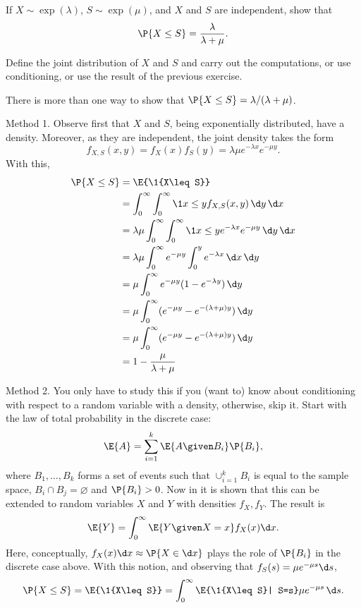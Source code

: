 \begin{exercise}\label{ex:3}
   If $X\sim \exp(\lambda)$, $S\sim\exp(\mu)$, and $X$ and $S$ are independent, show that 
    \begin{equation*}
      \P{X\leq S} = \frac{\lambda}{\lambda+\mu}.
    \end{equation*}
    \begin{hint}
     Define the joint distribution of $X$ and $S$ and carry out
      the computations, or use conditioning, or use the result of the
      previous exercise.
    \end{hint}
\begin{solution}
There is more than one way to show that $\P{X\leq S} = \lambda/(\lambda+\mu)$.  

Method 1. 
Observe first that $X$ and $S$, being
exponentially distributed, have a density. Moreover, as they are
independent,  the joint density takes the form
\begin{equation*}
f_{X,S}(x,y) = f_X(x)f_S(y) = \lambda \mu e^{-\lambda x} e^{-\mu
  y}.
\end{equation*}
With this,
\begin{align*}
    \P{X\leq S} 
&= \E{\1{X\leq S}} \\
&= \int_0^\infty \int_0^\infty \1{x\leq y} f_{X,S}(x,y)\, \d y\,\d x\\
&= \lambda \mu \int_0^\infty \int_0^\infty \1{x\leq y} e^{-\lambda x} e^{-\mu y} \, \d y\,\d x\\
&= \lambda \mu \int_0^\infty e^{-\mu y} \int_0^y e^{-\lambda x}\, \d x \, \d y \\
&= \mu \int_0^\infty e^{-\mu y} (1-e^{-\lambda y})\,\d y\\
&= \mu \int_0^\infty (e^{-\mu y} - e^{-(\lambda +\mu)y} ) \,\d y\\
&= \mu \int_0^\infty (e^{-\mu y} - e^{-(\lambda +\mu)y} ) \,\d y\\
&= 1 - \frac{\mu}{\lambda + \mu} 
\end{align*}

Method 2. You only have to study this if you (want to) know about conditioning with respect to a random variable with a density, otherwise, skip it.  Start with  the law of total probability in the discrete case: 
\begin{equation*}
  \E{A} = \sum_{i=1}^k \E{A\given B_i} \P{B_i},
\end{equation*}
where $B_1,\ldots, B_k$ forms a set of events such that $\cup_{i=1}^k B_i$ is equal to the sample space, $B_i\cap B_j = \varnothing$ and $\P{B_i}>0$. Now in \cite{capinski03:_probab_probl} it is shown that this can be extended to random variables $X$ and $Y$ with densities $f_X, f_Y$. The result is
\begin{equation*}
  \E{Y} = \int_0^\infty \E{Y\given X=x} f_X(x)\d x.
\end{equation*}
Here, conceptually, $f_X(x)\d x \approx \P{X\in \d x}$ plays the role of $\P{B_i}$ in the discrete case above. With this notion, and observing that $f_S(s) = \mu e^{-\mu s} \d s$,
\begin{equation*}
\P{X\leq S} = \E{\1{X\leq S}} = \int_0^\infty \E{\1{X\leq S}| S=s} \mu e^{-\mu s} \,  \d s.
\end{equation*}


\end{solution}
\end{exercise}
